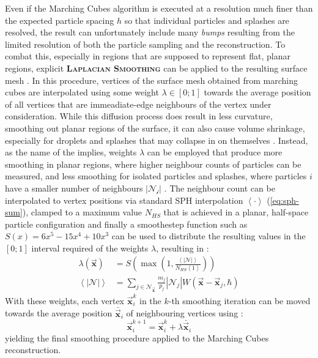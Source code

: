 \documentclass[oneside, a4paper]{book}
\newcommand\emphasis[1]{{\scshape\bfseries#1}}
\newcommand\abs[1]{\left|#1\right|}
\newcommand\angled[1]{\left\langle#1\right\rangle}
\newcommand\vek[1]{\vec{\bm{#1}}}
\newcommand\br[1]{\left(#1\right)}
\begin{document}
  Even if the Marching Cubes algorithm is executed at a resolution much finer than the expected particle spacing $h$ so that individual particles and splashes are resolved, the result can unfortunately include many \textit{bumps} resulting from the limited resolution of both the particle sampling and the reconstruction. To combat this, especially in regions that are supposed to represent flat, planar regions, explicit \emphasis{Laplacian Smoothing} can be applied to the resulting surface mesh \autocite{laplacian-surf-reconst}. In this procedure, vertices of the surface mesh obtained from marching cubes are interpolated using some weight $\lambda\in[0;1]$ towards the average position of all vertices that are immeadiate-edge neighbours of the vertex under consideration. While this diffusion process does result in less curvature, smoothing out planar regions of the surface, it can also cause volume shrinkage, especially for droplets and splashes that may collapse in on themselves \autocite{laplacian-surf-reconst}. Instead, as the name of the \autocite[Weighted Laplacian Smoothing]{laplacian-surf-reconst} implies, weights $\lambda$ can be employed that produce more smoothing in planar regions, where higher neighbour counts of particles can be measured, and less smoothing for isolated particles and splashes, where particles $i$ have a smaller number of neighbours $\abs{\mathcal{N_{i}}}$ \autocite{laplacian-surf-reconst}. The neighbour count can be interpolated to vertex positions via standard SPH interpolation $\angled{\cdot}$ (\autoref{eq:sph-sum}), clamped to a maximum value $N_{HS}$ that is achieved in a planar, half-space particle configuration and finally a smoothestep function such as $S(x)=6x^5-15x^4+10x^3$ can be used to distribute the resulting values in the $[0;1]$ interval required of the weights $\lambda$, resulting in \autocite{laplacian-surf-reconst}:
  \begin{align}
    \lambda\br{\vek{x}} &= S\br{\max\br{1, \frac{\angled{\abs{\mathcal{N}}}}{N_{HS}\angled{1}}}}\\
    \angled{\abs{\mathcal{N}}} &= \sum_{j\in\mathcal{N}_{\vek{x}}} \frac{m_j}{p_j} \abs{\mathcal{N}_j} W\br{\vek{x}-\vek{x}_j, \hbar}
  \end{align}
  With these weights, each vertex $\vek{x}_i^k$ in the $k$-th smoothing iteration can be moved towards the average position $\bar{\vek{x}}_i$ of neighbouring vertices using \autocite{laplacian-surf-reconst}:
  \begin{equation}
    \vek{x}_i^{k+1} = \vek{x}_i^{k} + \lambda \bar{\vek{x}}_i
  \end{equation}
  yielding the final smoothing procedure applied to the Marching Cubes reconstruction.
\end{document}
